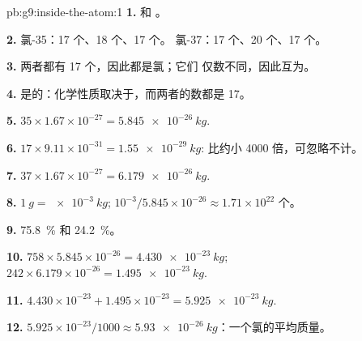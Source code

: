 \begin{solution}{pb:g9:inside-the-atom:1}
\textbf{1.}  和 。

\textbf{2.} 氯-35：17 个、18 个、17 个。
氯-37：17 个、20 个、17 个。

\textbf{3.} 两者都有 17 个，因此都是氯；它们
仅数不同，因此互为。

\textbf{4.} 是的：化学性质取决于，而两者的数都是 17。

\textbf{5.} $35 \times 1.67 \times 10^{-27} = \qty{5.845e-26}{kg}$.

\textbf{6.} $17 \times 9.11 \times 10^{-31} = \qty{1.55e-29}{kg}$:
比约小 4000 倍，可忽略不计。

\textbf{7.} $37 \times 1.67 \times 10^{-27} = \qty{6.179e-26}{kg}$.

\textbf{8.} $\qty{1}{g} = \qty{e-3}{kg}$; $10^{-3} / 5.845 \times
10^{-26} \approx 1.71 \times 10^{22}$ 个。

\textbf{9.} \qty{75.8}{\percent} 和 \qty{24.2}{\percent}。

\textbf{10.} $758 \times 5.845 \times 10^{-26} = \qty{4.430e-23}{kg}$;
$242 \times 6.179 \times 10^{-26} = \qty{1.495e-23}{kg}$.

\textbf{11.} $4.430 \times 10^{-23} + 1.495 \times 10^{-23} =
\qty{5.925e-23}{kg}$.

\textbf{12.} $5.925 \times 10^{-23} / 1000 \approx
\qty{5.93e-26}{kg}$：一个氯的平均质量。
\end{solution}
